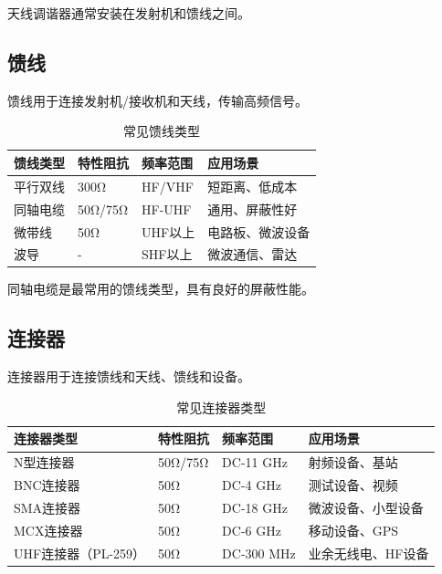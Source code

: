 天线调谐器通常安装在发射机和馈线之间。

\subsection{馈线}
\label{sec:feeder}

馈线用于连接发射机/接收机和天线，传输高频信号。

\begin{table}[htbp]
    \centering
    \small
    \caption{常见馈线类型}
    \begin{tabular}{|p{2.5cm}|p{2cm}|p{2cm}|p{3cm}|}
        \hline
        \textbf{馈线类型} & \textbf{特性阻抗} & \textbf{频率范围} & \textbf{应用场景} \\
        \hline
        平行双线 & 300Ω & HF/VHF & 短距离、低成本 \\
        \hline
        同轴电缆 & 50Ω/75Ω & HF-UHF & 通用、屏蔽性好 \\
        \hline
        微带线 & 50Ω & UHF以上 & 电路板、微波设备 \\
        \hline
        波导 & - & SHF以上 & 微波通信、雷达 \\
        \hline
    \end{tabular}
\end{table}

同轴电缆是最常用的馈线类型，具有良好的屏蔽性能。

\subsection{连接器}
\label{sec:connectors}

连接器用于连接馈线和天线、馈线和设备。

\begin{table}[htbp]
    \centering
    \small
    \caption{常见连接器类型}
    \begin{tabular}{|p{2.5cm}|p{2cm}|p{2.5cm}|p{3cm}|}
        \hline
        \textbf{连接器类型} & \textbf{特性阻抗} & \textbf{频率范围} & \textbf{应用场景} \\
        \hline
        N型连接器 & 50Ω/75Ω & DC-11 GHz & 射频设备、基站 \\
        \hline
        BNC连接器 & 50Ω & DC-4 GHz & 测试设备、视频 \\
        \hline
        SMA连接器 & 50Ω & DC-18 GHz & 微波设备、小型设备 \\
        \hline
        MCX连接器 & 50Ω & DC-6 GHz & 移动设备、GPS \\
        \hline
        UHF连接器（PL-259） & 50Ω & DC-300 MHz & 业余无线电、HF设备 \\
        \hline
    \end{tabular}
\end{table}

